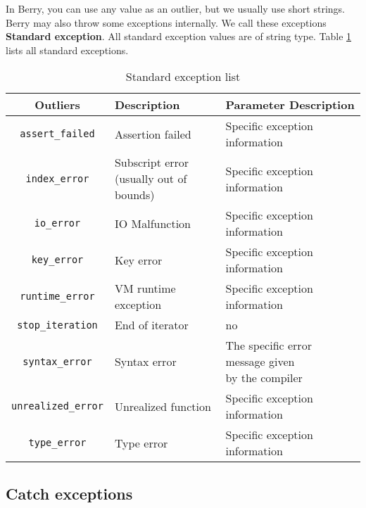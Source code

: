 In Berry, you can use any value as an outlier, but we usually use short strings. Berry may also throw some exceptions internally. We call these exceptions \textbf{Standard exception}. All standard exception values   are of string type. Table \ref{tab::stdexpect_list} lists all standard exceptions.
\begin{table}[htb]
    \centering
    \setlength{\tabcolsep}{3mm}
    \begin{tabular}{cll} \toprule
        \textbf{Outliers} & \textbf{Description} & \textbf{Parameter Description} \\ \midrule
        \texttt{assert\_failed} & Assertion failed & Specific exception information \\
        \texttt{index\_error} & \makecell[l]{Subscript error \\ (usually out of bounds)} & Specific exception information \\
        \texttt{io\_error} & IO Malfunction & Specific exception information \\
        \texttt{key\_error} & Key error & Specific exception information \\
        \texttt{runtime\_error} & VM runtime exception & Specific exception information \\
        \texttt{stop\_iteration} & End of iterator & no \\
        \texttt{syntax\_error} & Syntax error & \makecell[l]{The specific error message given \\ by the compiler} \\
        \texttt{unrealized\_error} & Unrealized function & Specific exception information \\
        \texttt{type\_error} & Type error & Specific exception information \\
        \bottomrule
    \end{tabular}
    \caption{Standard exception list}
    \label{tab::stdexpect_list}
\end{table}

\subsection {Catch exceptions}

